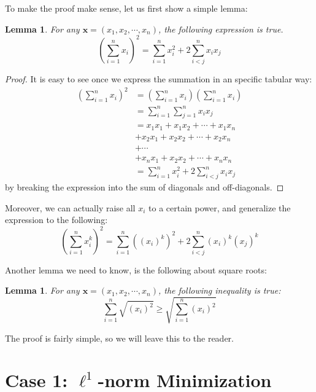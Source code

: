 \documentclass[11pt]{article}
\newtheorem{lemma}[theorem]{Lemma}
\begin{document}
\noindent
To make the proof make sense, let us first show a simple lemma:
\begin{lemma}\label{eq:4}
    For any $\bm{x} = (x_1, x_2, \cdots, x_n)$, the following expression is true. 
    \begin{equation}
        (\sum^n_{i=1} x_i)^2 = \sum^n_{i=1} x_i^2 + 2\sum^n_{i < j} x_ix_j
    \end{equation}
\end{lemma}
\begin{proof}
    It is easy to see once we express the summation in an specific tabular way:
    \begin{align*}
        (\sum^n_{i=1} x_i)^2 
        &= (\sum^n_{i=1} x_i)(\sum^n_{i=1} x_i) \\
        &= \sum^n_{i=1} \sum^n_{j=1} x_i x_j \\
        &= x_1x_1 + x_1x_2 + \cdots + x_1x_n \\
        & + x_2x_1 + x_2x_2 + \cdots + x_2x_n \\ 
        & + \cdots \\
        & + x_nx_1 + x_2x_2 + \cdots + x_nx_n \\
        & = \sum^n_{i=1} x_i^2 + 2\sum^n_{i < j} x_ix_j
    \end{align*}
    by breaking the expression into the sum of diagonals and off-diagonals.
\end{proof}

Moreover, we can actually raise all $x_{i}$ to a certain power, and generalize the expression to the following:
\begin{equation}
	(\sum^n_{i=1} x_i^{k})^2 = \sum^n_{i=1} ((x_i)^{k})^2 + 2\sum^n_{i < j} (x_i)^{k}(x_j)^{k}
\end{equation}

Another lemma we need to know, is the following about square roots:
\begin{lemma} For any $\bm{x} = (x_1, x_2, \cdots, x_n)$, the following inequality is true:
    \begin{equation}\label{eq:5}
        \sum^n_{i=1} \sqrt{(x_i)^2} \geq \sqrt{\sum^n_{i=1} (x_i)^2} 
    \end{equation}
\end{lemma}

The proof is fairly simple, so we will leave this to the reader.


\section{Case 1: $\ell^1$-norm Minimization}
\end{document}
